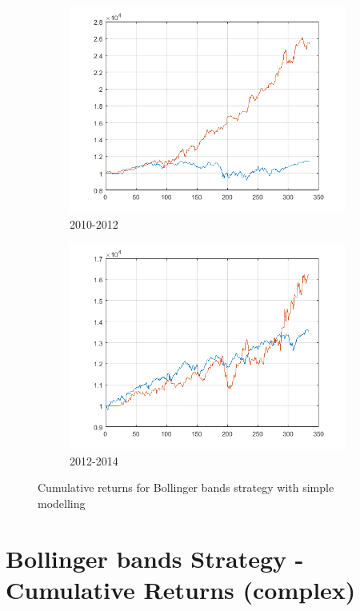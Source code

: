 \documentclass[11pt,a4,twosided,singlespacing,titlepagenumber=on]{scrreprt}
\numberwithin{equation}{chapter} %
\theoremstyle{remark}
\begin{document}
\begin{figure}[H]
\begin{subfigure}[t]{0.32\textwidth}
        \includegraphics[width=1\textwidth]{res/backtest/11}
        \caption{2010-2012}
    \end{subfigure}
    \begin{subfigure}[t]{0.32\textwidth}
        \centering
        \includegraphics[width=1\textwidth]{res/backtest/12}
        \caption{2012-2014}
    \end{subfigure}
    \caption[]{Cumulative returns for Bollinger bands strategy with simple modelling}
    \label{fig:bollinger_bands_strategy_simple}
\end{figure}

\section{Bollinger bands Strategy - Cumulative Returns (complex)}
\label{app:portfolio_valuation_complex}
\end{document}
